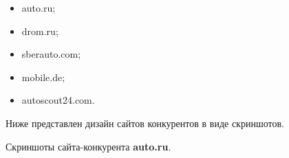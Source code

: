 \begin{itemize}
    \item auto.ru;
    \item drom.ru;
    \item sberauto.com;
    \item mobile.de;
    \item autoscout24.com.
\end{itemize}

Ниже представлен дизайн сайтов конкурентов в виде скриншотов.
\bigskip

Скриншоты сайта-конкурента \textbf{auto.ru}.

\noindent
\begin{minipage}{\linewidth}
\end{minipage}
\bigskip

\noindent
\begin{minipage}{\linewidth}
\end{minipage}
\bigskip

